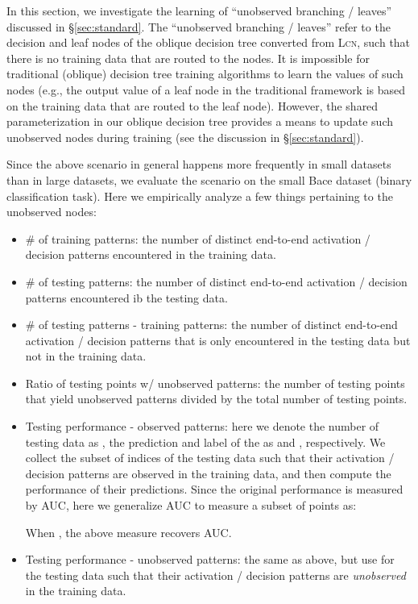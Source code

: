 \documentclass{article} \usepackage{iclr2020_conference,times}
\newcommand{\xref}[1]{\S\ref{#1}}
\begin{document}
In this section, we investigate the learning of ``unobserved branching / leaves'' discussed in \xref{sec:standard}. The ``unobserved branching / leaves'' refer to the decision and leaf nodes of the oblique decision tree converted from \textsc{Lcn}, such that there is no training data that are routed to the nodes. It is impossible for traditional (oblique) decision tree training algorithms to learn the values of such nodes (e.g., the output value of a leaf node in the traditional framework is based on the training data that are routed to the leaf node). However, the shared parameterization in our oblique decision tree provides a means to update such unobserved nodes during training (see the discussion in \xref{sec:standard}). 

Since the above scenario in general happens more frequently in small datasets than in large datasets, we evaluate the scenario on the small Bace dataset (binary classification task). Here we empirically analyze a few things pertaining to the unobserved nodes:
\begin{itemize}[leftmargin=4mm]
\vspace{-1mm}
    \item \# of training patterns: the number of distinct end-to-end activation / decision patterns  encountered in the training data.
\vspace{-1mm}
    \item \# of testing patterns: the number of distinct end-to-end activation / decision patterns  encountered ib the testing data.
\vspace{-1mm}
    \item \# of testing patterns - training patterns: the number of distinct end-to-end activation / decision patterns  that is only encountered in the testing data but not in the training data.
\vspace{-1mm}
    \item Ratio of testing points w/ unobserved patterns: the number of testing points that yield unobserved patterns divided by the total number of testing points. 
\vspace{-1mm}
    \item Testing performance - observed patterns: here we denote the number of testing data as , the prediction and label of the  as  and , respectively. We collect the subset of indices  of the testing data such that their activation / decision patterns  are observed in the training data, and then compute the performance of their predictions. Since the original performance is measured by AUC, here we generalize AUC to measure a subset of points  as:
    
    When , the above measure recovers AUC. 
\vspace{-1mm}
    \item Testing performance - unobserved patterns: the same as above, but use  for the testing data such that their activation / decision patterns  are \emph{unobserved} in the training data.
\vspace{-1mm}
\end{itemize}
\end{document}
